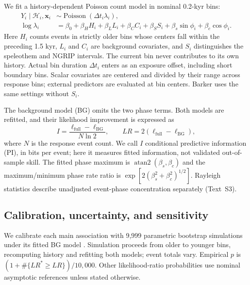 \documentclass[11pt]{article}
\begin{document}
We fit a history-dependent Poisson count model \citep{davis2003observation,truccolo2005point} in nominal 0.2-kyr bins:
\begin{align}
Y_i\mid\mathcal H_i,\mathbf x_i&\sim\operatorname{Poisson}(\Delta t_i\lambda_i),\label{eq:counts}\\
\log\lambda_i&=\beta_0+\beta_H H_i+\beta_L L_i+\beta_C C_i+\beta_S S_i
+\beta_s\sin\phi_i+\beta_c\cos\phi_i.\label{eq:rate}
\end{align}
Here $H_i$ counts events in strictly older bins whose centers fall within the preceding 1.5 kyr, $L_i$ and $C_i$ are background covariates, and $S_i$ distinguishes the speleothem and NGRIP intervals. The current bin never contributes to its own history. Actual bin duration $\Delta t_i$ enters as an exposure offset, including short boundary bins. Scalar covariates are centered and divided by their range across response bins; external predictors are evaluated at bin centers. Barker uses the same settings without $S_i$.

The background model (BG) omits the two phase terms. Both models are refitted, and their likelihood improvement is expressed as
\begin{equation}
I=\frac{\ell_{\mathrm{full}}-\ell_{\mathrm{BG}}}{N\ln2},\qquad
LR=2(\ell_{\mathrm{full}}-\ell_{\mathrm{BG}}),\label{eq:pi}
\end{equation}
where $N$ is the response event count. We call $I$ conditional predictive information (PI), in bits per event; here it measures fitted information, not validated out-of-sample skill. The fitted phase maximum is $\operatorname{atan2}(\beta_s,\beta_c)$ and the maximum/minimum phase rate ratio is $\exp[2(\beta_s^2+\beta_c^2)^{1/2}]$. Rayleigh statistics describe unadjusted event-phase concentration separately (Text~S3).

\subsection{Calibration, uncertainty, and sensitivity}
We calibrate each main association with 9,999 parametric bootstrap simulations under its fitted BG model \citep{davison1997bootstrap}. Simulation proceeds from older to younger bins, recomputing history and refitting both models; event totals vary. Empirical $p$ is $(1+\#\{LR^*\geq LR\})/10{,}000$. Other likelihood-ratio probabilities use nominal asymptotic references unless stated otherwise.
\end{document}
